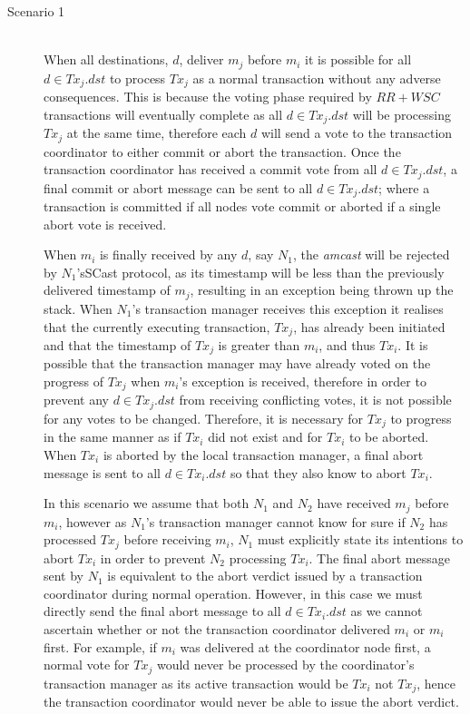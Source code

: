     \begin{description}
         \item[Scenario 1] \hfill \\
         When all destinations, $d$, deliver $m_j$ before $m_i$  it is possible for all $d \in Tx_j.dst$ to process $Tx_j$ as a normal transaction without any adverse consequences.  This is because the voting phase required by $RR + WSC$ transactions will eventually complete as all $d \in Tx_j.dst$ will be processing $Tx_j$ at the same time, therefore each $d$ will send a vote to the transaction coordinator to either commit or abort the transaction.  Once the transaction coordinator has received a commit vote from all $d \in Tx_j.dst$, a final commit or abort message can be sent to all $d \in Tx_j.dst$; where a transaction is committed if all nodes vote commit or aborted if a single abort vote is received.  
         
         When $m_i$ is finally received by any $d$, say $N_1$, the \emph{amcast} will be rejected by $N_1$'s\textsf{SCast} protocol, as its timestamp will be less than the previously delivered timestamp of $m_j$, resulting in an exception being thrown up the stack.  When $N_1$'s transaction manager receives this exception it realises that the currently executing transaction, $Tx_j$, has already been initiated and that the timestamp of $Tx_j$ is greater than $m_i$, and thus $Tx_i$.  It is possible that the transaction manager may have already voted on the progress of $Tx_j$ when $m_i$'s exception is received, therefore in order to prevent any $d \in Tx_j.dst$ from receiving conflicting votes, it is not possible for any votes to be changed.  Therefore, it is necessary for $Tx_j$ to progress in the same manner as if $Tx_i$ did not exist and for $Tx_i$ to be aborted.  When $Tx_i$ is aborted by the local transaction manager, a final abort message is sent to all $d \in Tx_i.dst$ so that they also know to abort $Tx_i$.  
         
         In this scenario we assume that both $N_1$ and $N_2$ have received $m_j$ before $m_i$, however as $N_1$'s transaction manager cannot know for sure if $N_2$ has processed $Tx_j$ before receiving $m_i$, $N_1$ must explicitly state its intentions to abort $Tx_i$ in order to prevent $N_2$ processing $Tx_i$.  The final abort message sent by $N_1$ is equivalent to the abort verdict issued by a transaction coordinator during normal operation.  However, in this case we must directly send the final abort message to all $d \in Tx_i.dst$ as we cannot ascertain whether or not the transaction coordinator delivered $m_i$ or $m_i$ first.  For example, if $m_i$ was delivered at the coordinator node first, a normal vote for $Tx_j$ would never be processed by the coordinator's transaction manager as its active transaction would be $Tx_i$ not $Tx_j$, hence the transaction coordinator would never be able to issue the abort verdict.  
         

\end{description}
